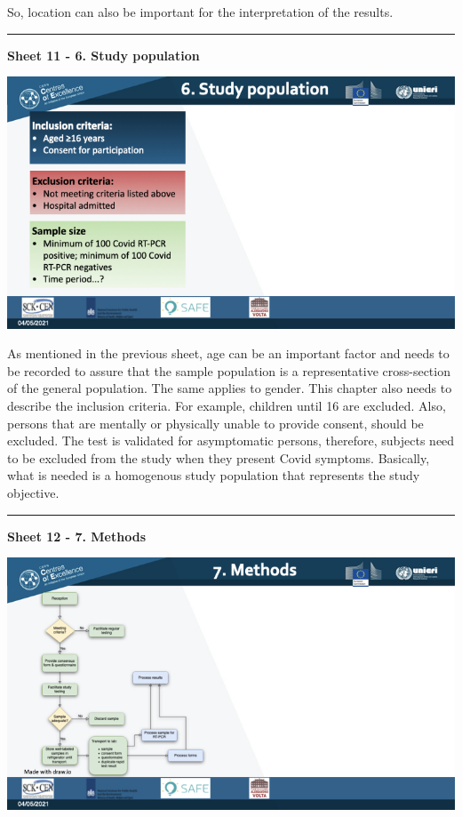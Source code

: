 \documentclass[
]{book}
\begin{document}
So, location can also be important for the interpretation of the
results.

\begin{center}\rule{0.5\linewidth}{0.5pt}\end{center}

\textbf{Sheet 11 - 6. Study population}

\includegraphics{images/m03/m03_validation_of_test_kits_v2_2.011.jpeg}

As mentioned in the previous sheet, age can be an important factor and
needs to be recorded to assure that the sample population is a
representative cross-section of the general population. The same applies
to gender. This chapter also needs to describe the inclusion criteria.
For example, children until 16 are excluded. Also, persons that are
mentally or physically unable to provide consent, should be excluded.
The test is validated for asymptomatic persons, therefore, subjects need
to be excluded from the study when they present Covid symptoms.
Basically, what is needed is a homogenous study population that
represents the study objective.

\begin{center}\rule{0.5\linewidth}{0.5pt}\end{center}

\textbf{Sheet 12 - 7. Methods}

\includegraphics{images/m03/m03_validation_of_test_kits_v2_2.012.jpeg}
\end{document}
